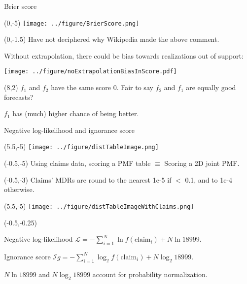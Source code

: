 \documentclass[aspectratio=169]{beamer}
\begin{document}
\begin{frame}{Brier score}
\begin{textblock}{1}(0,-5)
\texttt{[image: ../figure/BrierScore.png]}
\end{textblock}


\begin{textblock}{14}(0,-1.5)
Have not deciphered why Wikipedia made the above comment.\medskip

Without extrapolation, there could be bias towards realizations out of support:\medskip

\texttt{[image: ../figure/noExtrapolationBiasInScore.pdf]}

\end{textblock}


\begin{textblock}{5}(8,2)
$f_1$ and $f_2$ have the same score 0. Fair to say $f_2$ and $f_1$ are equally good forecasts? \medskip

$f_1$ has (much) higher chance of being better.
\end{textblock}


\end{frame}


\begin{frame}{Negative log-likelihood and ignorance score}

\begin{textblock}{1}(5.5,-5)
\texttt{[image: ../figure/distTableImage.png]}
\end{textblock}


\begin{textblock}{5.5}(-0.5,-5)
\scriptsize Using claims data, scoring a PMF table $\equiv$ Scoring a 2D joint PMF.
\end{textblock}
\pause

\begin{textblock}{5.5}(-0.5,-3)
\scriptsize Claims' MDRs are round to the nearest 1e-5 if $<$ 0.1, and to 1e-4 otherwise.
\end{textblock}


\begin{textblock}{1}(5.5,-5)
\texttt{[image: ../figure/distTableImageWithClaims.png]}
\end{textblock}
\pause


\begin{textblock}{5.5}(-0.5,-0.25)

\scriptsize Negative log-likelihood $\mathcal{L} = -\sum_{i=1}^{N}\ln f(\text{claim}_i) + N\ln18999$. \medskip\medskip\medskip\medskip

\scriptsize Ignorance score $\mathcal{I}g = -\sum_{i=1}^{N}\log_2 f(\text{claim}_i) + N\log_2 18999 $.\medskip\medskip\medskip\medskip

\scriptsize $N\ln18999$ and $N\log_2 18999$ account for probability normalization.

\end{textblock}
\end{frame}
\end{document}
